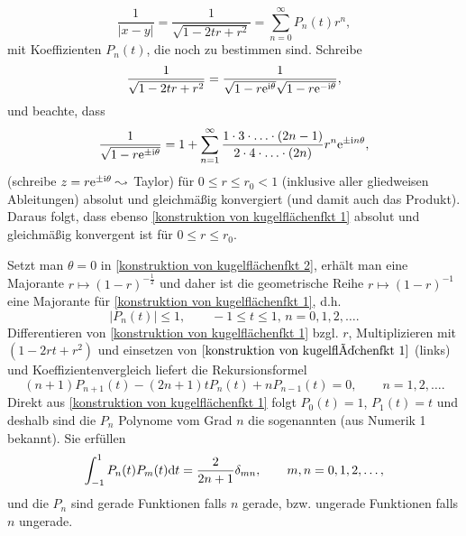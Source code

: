 \begin{equation}
	\label{konstruktion von kugelflächenfkt 1}
	\frac{1}{|x-y|}=\frac{1}{\sqrt{1-2tr+r^2}}=\sum_{n=0}^\infty P_n(t)r^n,
\end{equation}
mit Koeffizienten \(P_n(t)\), die noch zu bestimmen sind. Schreibe
\begin{equation*}
	\frac{1}{\sqrt{1-2tr+r^2}}=\frac{1}{\sqrt{1-r\mathrm{e}^{\mathrm{i}\theta}}\sqrt{1-r\mathrm{e}^{-\mathrm{i}\theta}}},
\end{equation*}
und beachte, dass
\begin{equation}
	\label{konstruktion von kugelflächenfkt 2}
	\frac{1}{\sqrt{1-r\mathrm{e}^{\pm\mathrm{i}\theta}}}=1+\sum_{n=1}^\infty\frac{1\cdot3\cdot\ldots\cdot(2n-1)}{2\cdot4\cdot\ldots\cdot(2n)}r^n\mathrm{e}^{\pm\mathrm{i} n\theta},
\end{equation}
(schreibe \(z=r\mathrm{e}^{\pm\mathrm{i}\theta}\leadsto\) Taylor) für \(0\leq r\leq r_0<1\) (inklusive aller gliedweisen Ableitungen) absolut und gleichmäßig konvergiert (und damit auch das Produkt). Daraus folgt, dass ebenso \eqref{konstruktion von kugelflächenfkt 1} absolut und gleichmäßig konvergent ist für \(0\leq r\leq r_0\).\vspace{1mm}

Setzt man \(\theta=0\) in \eqref{konstruktion von kugelflächenfkt 2}, erhält man eine Majorante \(r\mapsto(1-r)^{-\frac{1}{2}}\) und daher ist die geometrische Reihe \(r\mapsto(1-r)^{-1}\) eine Majorante für \eqref{konstruktion von kugelflächenfkt 1}, d.h.
\begin{equation}
	\label{Abschätzung der Pn}
	|P_n(t)|\leq1,\qquad-1\leq t\leq1,\,n=0,1,2,\ldots.
\end{equation}
Differentieren von \eqref{konstruktion von kugelflächenfkt 1} bzgl. \(r\), Multiplizieren mit \((1-2rt+r^2)\) und einsetzen von \(\eqref{konstruktion von kugelflächenfkt 1}\) (links) und Koeffizientenvergleich liefert die Rekursionsformel
\begin{equation}
	\label{rekursionsformel für Pn}
	(n+1)P_{n+1}(t)-(2n+1)tP_n(t)+nP_{n-1}(t)=0,\qquad n=1,2,\ldots.
\end{equation}
Direkt aus \eqref{konstruktion von kugelflächenfkt 1} folgt \(P_0(t)=1\), \(P_1(t)=t\) und deshalb sind die \(P_n\) Polynome vom Grad \(n\) die sogenannten  (aus Numerik 1 bekannt). Sie erfüllen
\begin{equation*}
	\int_{-1}^1P_n(t)P_m(t)\mathrm{d}t=\frac{2}{2n+1}\delta_{mn},\qquad m,n=0,1,2,\ldots,
\end{equation*}
und die \(P_n\) sind gerade Funktionen falls \(n\) gerade, bzw. ungerade Funktionen falls \(n\) ungerade.\vspace{1mm}

